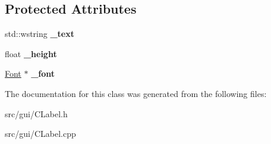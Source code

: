 \subsection*{Protected Attributes}
\begin{DoxyCompactItemize}
\item 
\hypertarget{class_c_label_ae593eee3349e51a5565c00a7643b4cee}{
std::wstring {\bfseries \_\-text}}
\label{class_c_label_ae593eee3349e51a5565c00a7643b4cee}

\item 
\hypertarget{class_c_label_a1d6dfac41eaad67fa576af9405deab6d}{
float {\bfseries \_\-height}}
\label{class_c_label_a1d6dfac41eaad67fa576af9405deab6d}

\item 
\hypertarget{class_c_label_a010aab1e4ba2d4bc487a59eb83af4507}{
\hyperlink{class_font}{Font} $\ast$ {\bfseries \_\-font}}
\label{class_c_label_a010aab1e4ba2d4bc487a59eb83af4507}

\end{DoxyCompactItemize}


The documentation for this class was generated from the following files:\begin{DoxyCompactItemize}
\item 
src/gui/CLabel.h\item 
src/gui/CLabel.cpp\end{DoxyCompactItemize}
